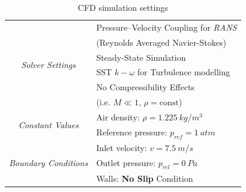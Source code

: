 \begin{table}[t]
\caption{CFD simulation settings}
\label{table:cfd}
	\centering
	\begin{tabular}{c|l}
	    \toprule
	    \multirow{6}{*}{\textit{Solver Settings}} & Pressure--Velocity Coupling for \emph{RANS} \\ & (Reynolds Averaged Navier-Stokes) \\ & Steady-State Simulation\\ & SST $k - \omega$ for Turbulence modelling \\ & No Compressibility Effects \\ & (i.e. $M\ll1$, $\rho = \text{const}$)\\
		\midrule
		\multirow{2}{*}{\textit{Constant Values}} & Air density: $\rho = \SI{1.225}{kg/m^3}$ \\ & Reference pressure: $p_{ref} = \SI{1}{atm}$\\
        \midrule
        \multirow{3}{*}{\textit{Boundary Conditions}} & Inlet velocity: $v = \SI{7.5}{m/s}$ \\ & Outlet pressure: $p_{rel} = \SI{0}{Pa}$\\ & Walls: \textbf{No Slip} Condition\\
		\bottomrule
	\end{tabular}
\end{table}


